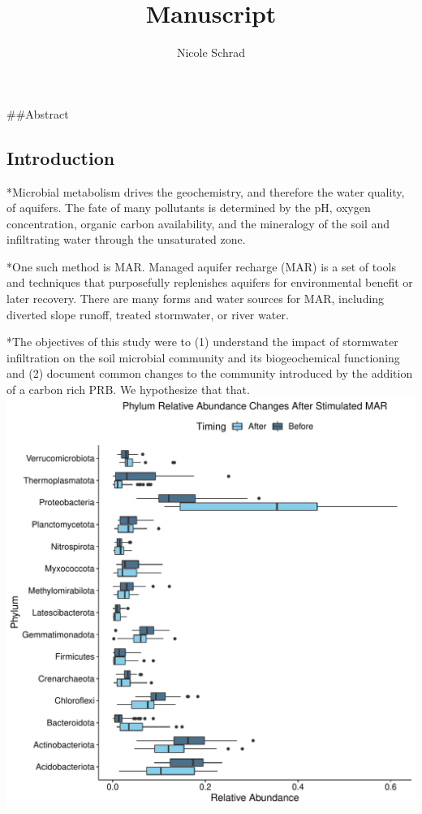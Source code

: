 \documentclass[
  12pt,
]{article}
\title{Manuscript}
\author{Nicole Schrad}
\date{}
\begin{document}
\maketitle

\#\#Abstract

\hypertarget{introduction}{%
\subsection{Introduction}\label{introduction}}

*Microbial metabolism drives the geochemistry, and therefore the water
quality, of aquifers. The fate of many pollutants is determined by the
pH, oxygen concentration, organic carbon availability, and the
mineralogy of the soil and infiltrating water through the unsaturated
zone.

*One such method is MAR. Managed aquifer recharge (MAR) is a set of
tools and techniques that purposefully replenishes aquifers for
environmental benefit or later recovery. There are many forms and water
sources for MAR, including diverted slope runoff, treated stormwater, or
river water.

*The objectives of this study were to (1) understand the impact of
stormwater infiltration on the soil microbial community and its
biogeochemical functioning and (2) document common changes to the
community introduced by the addition of a carbon rich PRB. We
hypothesize that that.\\
\includegraphics{Figures/unnamed-chunk-2-1.pdf}
\end{document}
